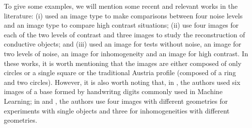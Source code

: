 				To give some examples, we will mention some recent and relevant works in the literature: (i) \cite{zhong2020multiresolution} used an image type to make comparisons between four noise levels and an image type to compare high contrast situations; (ii) \cite{wei2019deep} use four images for each of the two levels of contrast and three images to study the reconstruction of conductive objects; and (iii) \cite{salucci2017multifrequency} used an image for tests without noise, an image for two levels of noise, an image for inhomogeneity and an image for high contrast. In these works, it is worth mentioning that the images are either composed of only circles or a single square or the traditional Austria profile (composed of a ring and two circles). However, it is also worth noting that, in \citep{wei2019deep}, the authors used six images of a base formed by handwritng digits commonly used in Machine Learning; in \citep{shah2018fast} and \citep{batista2021quadratic}, the authors use four images with different geometries for experiments with single objects and three for inhomogeneities with different geometries.
				
